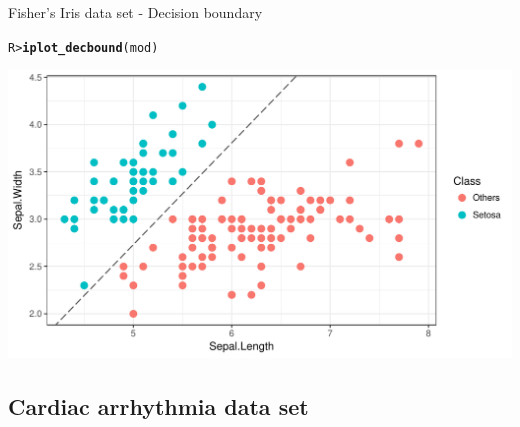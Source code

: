 \documentclass{beamer}\usepackage[]{graphicx}\usepackage[]{color}
\makeatletter
\def\maxwidth{ %
  \ifdim\Gin@nat@width>\linewidth
    \linewidth
  \else
    \Gin@nat@width
  \fi
}
\newcommand{\hlstd}[1]{\textcolor[rgb]{0.345,0.345,0.345}{#1}}%
\newcommand{\hlkwd}[1]{\textcolor[rgb]{0.737,0.353,0.396}{\textbf{#1}}}%
\newenvironment{kframe}{%
 \def\at@end@of@kframe{}%
 \ifinner\ifhmode%
  \def\at@end@of@kframe{\end{minipage}}%
  \begin{minipage}{\columnwidth}%
 \fi\fi%
 \def\FrameCommand##1{\hskip\@totalleftmargin \hskip-\fboxsep
 \colorbox{shadecolor}{##1}\hskip-\fboxsep
     \hskip-\linewidth \hskip-\@totalleftmargin \hskip\columnwidth}%
 \MakeFramed {\advance\hsize-\width
   \@totalleftmargin\z@ \linewidth\hsize
   \@setminipage}}%
 {\par\unskip\endMakeFramed%
 \at@end@of@kframe}
\newenvironment{knitrout}{}{} %
\makeatother
\begin{document}
\begin{frame}[fragile]{Fisher's Iris data set - Decision boundary}
\vspace{-5pt}
\begin{knitrout}\small
{}\color{fgcolor}\begin{kframe}
\begin{alltt}
\hlstd{R> }\hlkwd{iplot_decbound}\hlstd{(mod)}
\end{alltt}
\end{kframe}

{\centering \includegraphics[width=\maxwidth]{figure/iris-decbound-1} 

}



\end{knitrout}
\end{frame}

\subsection*{Cardiac arrhythmia data set}
\end{document}
